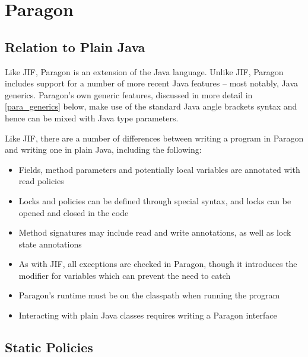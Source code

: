 \section{Paragon}

\subsection{Relation to Plain Java}

Like JIF, Paragon \cite{parawebsite} is an extension of the Java language. Unlike JIF, Paragon includes support for a number of more recent Java features -- most notably, Java generics. Paragon's own generic features, discussed in more detail in \ref{para_generics} below, make use of the standard Java angle brackets syntax and hence can be mixed with Java type parameters.

Like JIF, there are a number of differences between writing a program in Paragon and writing one in plain Java, including the following:

\begin{itemize}
	
	\item Fields, method parameters and potentially local variables are annotated with read policies
	
	\item Locks and policies can be defined through special syntax, and locks can be opened and closed in the code
	
	\item Method signatures may include read and write annotations, as well as lock state annotations
	
	\item As with JIF, all exceptions are checked in Paragon, though it introduces the  modifier for variables which can prevent the need to catch 
	
	\item Paragon's runtime must be on the classpath when running the program
	
	\item Interacting with plain Java classes requires writing a Paragon interface
	
\end{itemize}

\newpage

\subsection{Static Policies}


